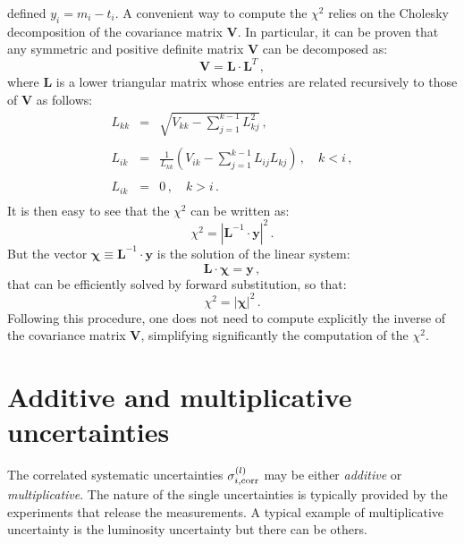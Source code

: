 \documentclass[10pt,a4paper]{article}
\begin{document}
defined $y_i = m_i-t_i$. A convenient way to compute the $\chi^2$
relies on the Cholesky decomposition of the covariance matrix
$\mathbf{V}$. In particular, it can be proven that any symmetric and
positive definite matrix $\mathbf{V}$ can be decomposed as:
\begin{equation}\label{eq:choleskydec}
\mathbf{V} = \mathbf{L}\cdot\mathbf{L}^{T}\,,
\end{equation}
where $\mathbf{L}$ is a lower triangular matrix whose entries are
related recursively to those of $\mathbf{V}$ as follows:
\begin{equation}\label{eq:cholalg}
\begin{array}{rcl}
  L_{kk} &=&\displaystyle \sqrt{V_{kk}-\sum_{j=1}^{k-1}L_{kj}^2}\,,\\
  \\
  L_{ik} &=&\displaystyle
             \frac{1}{L_{kk}}\left(V_{ik}-\sum_{j=1}^{k-1}L_{ij}L_{kj}\right)\,,\quad
             k < i\,,\\
\\
  L_{ik} &=&\displaystyle 0\,,\quad
             k > i\,.\\
\end{array}
\end{equation}
It is then easy to see that the $\chi^2$ can be written as:
\begin{equation}
\chi^2 = \left|\mathbf{L}^{-1}\cdot \mathbf{y}\right|^2\,.
\end{equation}
But the vector ${\bm \chi} \equiv \mathbf{L}^{-1}\cdot \mathbf{y}$ is
the solution of the linear system:
\begin{equation}\label{eq:chivdef}
  \mathbf{L} \cdot {\bm \chi} = \mathbf{y}\,,
\end{equation}
that can be efficiently solved by forward substitution, so that:
\begin{equation}
  \chi^2 = \left|{\bm \chi}\right|^2\,.
\end{equation}
Following this procedure, one does not need to compute explicitly the
inverse of the covariance matrix $\mathbf{V}$, simplifying
significantly the computation of the $\chi^2$.

\section{Additive and multiplicative uncertainties}

The correlated systematic uncertainties $\sigma_{i,\rm corr}^{(l)}$
may be either \textit{additive} or \textit{multiplicative}. The nature
of the single uncertainties is typically provided by the experiments
that release the measurements. A typical example of multiplicative
uncertainty is the luminosity uncertainty but there can be others.
\end{document}
